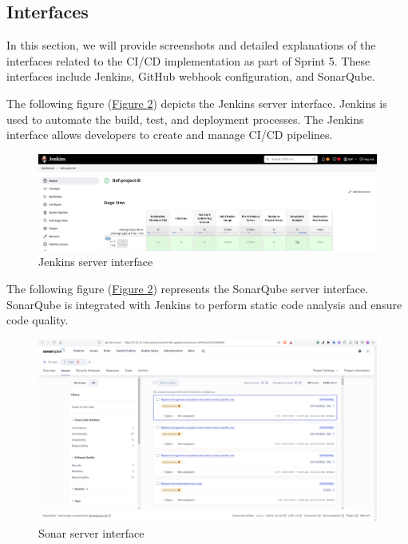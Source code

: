 \subsection{Interfaces}
In this section, we will provide screenshots and detailed explanations of the interfaces related to the CI/CD implementation as part of Sprint 5. These interfaces include Jenkins, GitHub webhook configuration, and SonarQube.

The following figure (\hyperref[fig:jenkins]{Figure \ref{fig:jenkins}})  depicts the Jenkins server interface.
Jenkins is used to automate the build, test, and deployment processes. The Jenkins interface allows developers to create and manage CI/CD pipelines.
\begin{figure}[h]
  \center
  \includegraphics[width=14cm]{./chapters/sprint5/jenkins.png}
  \caption{Jenkins server interface}
  \label{fig:jenkins}
\end{figure}

The following figure (\hyperref[fig:jenkins]{Figure \ref{fig:jenkins}})  represents the SonarQube server interface.
SonarQube is integrated with Jenkins to perform static code analysis and ensure code quality.
\begin{figure}[h]
  \center
  \includegraphics[width=14cm]{./chapters/sprint5/sonnar.png}
  \caption{Sonar server interface}
  \label{fig:jenkins}
\end{figure}

